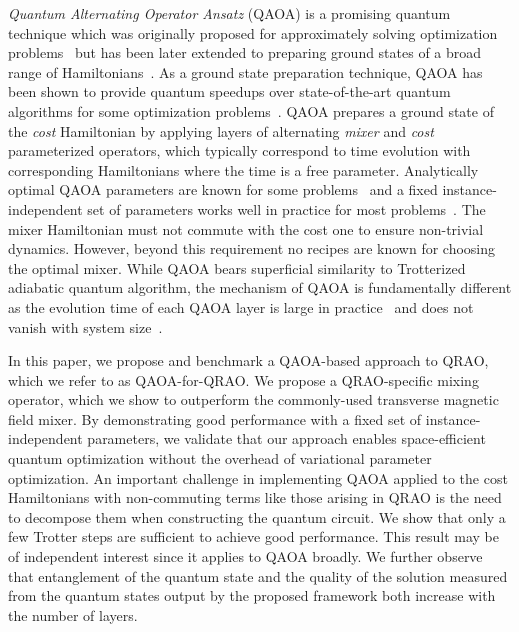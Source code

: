 \documentclass[conference,10pt]{IEEEtran}
\newcommand{\QAOAQRAO}{QAOA-for-QRAO}
\begin{document}
\emph{Quantum Alternating Operator Ansatz} (QAOA) is a promising quantum technique which was originally proposed for approximately solving optimization problems~\cite{Hogg2000,farhi2014quantum,Hadfield_2019} but has been later extended to preparing ground states of a broad range of Hamiltonians~\cite{Ho2019,kremenetski2021quantum}. As a ground state preparation technique, QAOA has been shown to provide quantum speedups over state-of-the-art quantum algorithms for some optimization problems~\cite{Boulebnane2024,shaydulin2023evidence}. QAOA prepares a ground state of the \emph{cost} Hamiltonian by applying layers of alternating \emph{mixer} and \emph{cost} parameterized operators, which typically correspond to time evolution with corresponding Hamiltonians where the time is a free parameter. Analytically optimal QAOA parameters are known for some problems~\cite{bassoQAOAsk,Sureshbabu2024} and a fixed instance-independent set of parameters works well in practice for most problems~\cite{Boulebnane2024,shaydulin2023evidence}. The mixer Hamiltonian must not commute with the cost one to ensure non-trivial dynamics. However, beyond this requirement no recipes are known for choosing the optimal mixer. While QAOA bears superficial similarity to Trotterized adiabatic quantum algorithm, the mechanism of QAOA is fundamentally different as the evolution time of each QAOA layer is large in practice~\cite{kremenetski2021quantum} and does not vanish with system size~\cite{bassoQAOAsk}.





In this paper, we propose and benchmark a QAOA-based approach to QRAO, which we refer to as \QAOAQRAO{}. We propose a QRAO-specific mixing operator, which we show to outperform the commonly-used transverse magnetic field mixer. By demonstrating good performance with a fixed set of instance-independent parameters, we validate that our approach enables space-efficient quantum optimization without the overhead of variational parameter optimization. 
An important challenge in implementing QAOA applied to the cost Hamiltonians with non-commuting terms like those arising in QRAO is the need to decompose them when constructing the quantum circuit. We show that only a few Trotter steps are sufficient to achieve good performance. This result may be of independent interest since it applies to QAOA broadly. We further observe that entanglement of the quantum state and the quality of the solution measured from the quantum states output by the proposed framework both increase with the number of layers. 
\end{document}
